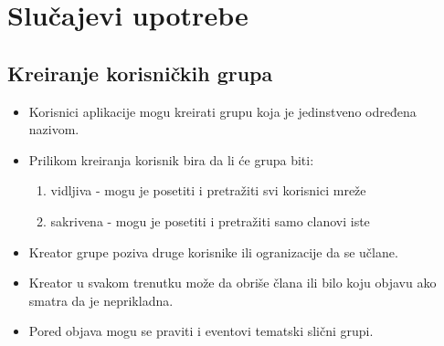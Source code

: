 \section{Slučajevi upotrebe}
\subsection{Kreiranje korisničkih grupa}
\begin{itemize}
\item Korisnici aplikacije mogu kreirati grupu koja je jedinstveno određena nazivom. 
\item Prilikom kreiranja korisnik bira da li će grupa biti:

\begin{enumerate}
\item vidljiva - mogu je posetiti i pretražiti svi korisnici mreže
\item sakrivena - mogu je posetiti i pretražiti samo clanovi iste
\end{enumerate}

\item	Kreator grupe poziva druge korisnike ili ogranizacije da se učlane.
\item	Kreator u svakom trenutku može da obriše člana ili bilo koju objavu ako smatra da je neprikladna.
\item	Pored objava mogu se praviti i eventovi tematski slični grupi.
\end{itemize}



